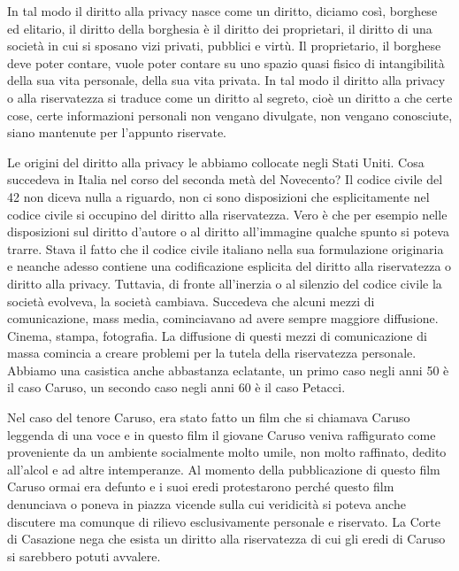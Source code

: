 In tal modo il diritto alla privacy nasce come un diritto, diciamo così, borghese ed elitario, il diritto della borghesia è il diritto dei proprietari, il diritto di una società in cui si sposano vizi privati, pubblici e virtù. Il proprietario, il borghese deve poter contare, vuole poter contare su uno spazio quasi fisico di intangibilità della sua vita personale, della sua vita privata. 
In tal modo il diritto alla privacy o alla riservatezza si traduce come un diritto al segreto, cioè un diritto a che certe cose, certe informazioni personali non vengano divulgate, non vengano conosciute, siano mantenute per l'appunto riservate. 

Le origini del diritto alla privacy le abbiamo collocate negli Stati Uniti. Cosa succedeva in Italia nel corso del seconda metà del Novecento? Il codice civile del 42 non diceva nulla a riguardo, non ci sono disposizioni che esplicitamente nel codice civile si occupino del diritto alla riservatezza. Vero è che per esempio nelle disposizioni sul diritto d'autore o al diritto all'immagine qualche spunto si poteva trarre. Stava il fatto che il codice civile italiano nella sua formulazione originaria e neanche adesso contiene una codificazione esplicita del diritto alla riservatezza o diritto alla privacy. 
Tuttavia, di fronte all'inerzia o al silenzio del codice civile la società evolveva, la società cambiava. Succedeva che alcuni mezzi di comunicazione, mass media, cominciavano ad avere sempre maggiore diffusione. Cinema, stampa, fotografia. La diffusione di questi mezzi di comunicazione di massa comincia a creare problemi per la tutela della riservatezza personale. 
Abbiamo una casistica anche abbastanza eclatante, un primo caso negli anni 50 è il caso Caruso, un secondo caso negli anni 60 è il caso Petacci. 

Nel caso del tenore Caruso, era stato fatto un film che si chiamava Caruso leggenda di una voce e in questo film il giovane Caruso veniva raffigurato come proveniente da un ambiente socialmente molto umile, non molto raffinato, dedito all'alcol e ad altre intemperanze. Al momento della pubblicazione di questo film Caruso ormai era defunto e i suoi eredi protestarono perché questo film denunciava o poneva in piazza vicende sulla cui veridicità si poteva anche discutere ma comunque di rilievo esclusivamente personale e riservato. 
La Corte di Casazione nega che esista un diritto alla riservatezza di cui gli eredi di Caruso si sarebbero potuti avvalere. 

